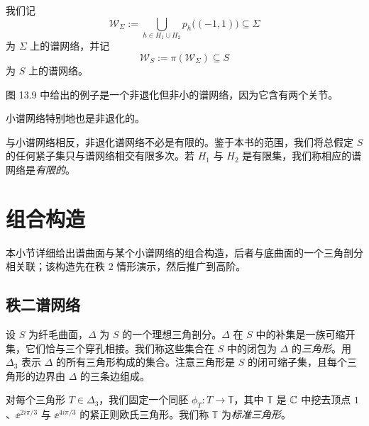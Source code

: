 我们记
\[
\mathcal{W}_\Sigma:=\bigcup_{h\in H_1\cup H_2}p_h\bigl((-1,1)\bigr)\subseteq\Sigma
\]
为 $\Sigma$ 上的谱网络，并记
\[
\mathcal{W}_S:=\pi(\mathcal{W}_\Sigma)\subseteq S
\]
为 $S$ 上的谱网络。

\begin{example}[13.13]
图 13.9 中给出的例子是一个非退化但非小的谱网络，因为它含有两个关节。
\end{example}


\begin{remark}[13.14]
小谱网络特别地也是非退化的。
\end{remark}

\begin{remark}[13.15]
与小谱网络相反，非退化谱网络不必是有限的。鉴于本书的范围，我们将总假定 $S$ 的任何紧子集只与谱网络相交有限多次。若 $H_1$ 与 $H_2$ 是有限集，我们称相应的谱网络是\emph{有限的}。
\end{remark}

\section{组合构造}

本小节详细给出谱曲面与某个小谱网络的组合构造，后者与底曲面的一个三角剖分相关联；该构造先在秩 $2$ 情形演示，然后推广到高阶。

\subsection{秩二谱网络}

设 $S$ 为纤毛曲面，$\Delta$ 为 $S$ 的一个理想三角剖分。$\Delta$ 在 $S$ 中的补集是一族可缩开集，它们恰与三个穿孔相接。我们称这些集合在 $S$ 中的闭包为 $\Delta$ 的\emph{三角形}。用 $\Delta_3$ 表示 $\Delta$ 的所有三角形构成的集合。注意三角形是 $S$ 的闭可缩子集，且每个三角形的边界由 $\Delta$ 的三条边组成。

对每个三角形 $T\in\Delta_3$，我们固定一个同胚 $\phi_T\colon T\to\mathbb{T}$，其中 $\mathbb{T}$ 是 $\mathbb{C}$ 中挖去顶点 $1$、$\ee^{2i\pi/3}$ 与 $\ee^{4i\pi/3}$ 的紧正则欧氏三角形。我们称 $\mathbb{T}$ 为\emph{标准三角形}。

